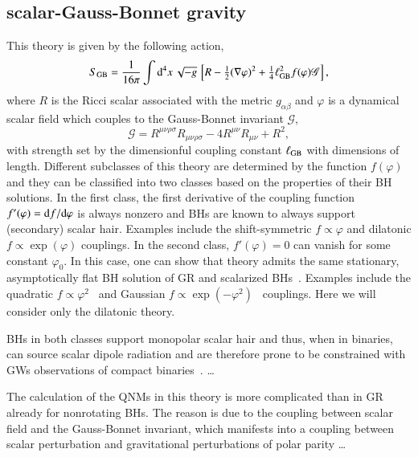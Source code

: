 \documentclass[twocolumn,
               prd,
               aps,
               superscriptaddress,
               tightenlines,
               nofootinbib,
               eqsecnum,
               amsfonts,
               amsmath,
               longbibliography]{revtex4-1}
\newcommand{\dd}{{\rm d}}
\newcommand{\dV}{{\rm d}^{4}x \, \sqrt{-g} \,}
\begin{document}
\subsection{scalar-Gauss-Bonnet gravity}
%
This theory is given by the following action,
%
\begin{equation} \label{eq:action_sgb}
    S_{\rm GB} = \frac{1}{16 \pi}
    \int \dV
    \left[
    R - \tfrac{1}{2}(\nabla \varphi)^2
    + \tfrac{1}{4} \ell^{2}_{\rm GB} f(\varphi) \mathscr{G}
    \right],
\end{equation}
%
where $R$ is the Ricci scalar associated with the metric $g_{\alpha\beta}$ and
$\varphi$ is a dynamical scalar field which couples to the Gauss-Bonnet
invariant $\mathscr{G}$,
%
\begin{equation} \label{eq:def_gb}
    \mathscr{G} =
    R^{\mu\nu\rho\sigma}R_{\mu\nu\rho\sigma}
    - 4 R^{\mu\nu}R_{\mu\nu}
    + R^2,
\end{equation}
%
with strength set by the dimensionful coupling constant $\ell_{\rm GB}$ with dimensions
of length. Different subclasses of this theory are determined by the function $f(\varphi)$
and they can be classified into two classes based on the properties of their BH solutions.
%
In the first class, the first derivative of the coupling
function $f'(\varphi) = \dd f  / \dd \varphi$ is always nonzero and BHs
are known to always support (secondary) scalar hair.
%
Examples include the shift-symmetric $f \propto \varphi$ and dilatonic
$f \propto \exp(\varphi)$ couplings.
%
In the second class, $f'(\varphi) = 0$ can vanish for some constant $\varphi_0$.
%
In this case, one can show that theory admits the same stationary,
asymptotically flat BH solution of GR and scalarized BHs~\cite{Doneva:2017bvd,Silva:2017uqg,Dima:2020yac,Herdeiro:2020wei,Berti:2020kgk}.
%
Examples include the quadratic $f \propto \varphi^2$~\cite{Silva:2017uqg}
and Gaussian $f \propto \exp(-\varphi^2)$~\cite{Doneva:2017bvd} couplings.
%
Here we will consider only the dilatonic theory.

BHs in both classes support monopolar scalar hair and thus, when in binaries,
can source scalar dipole radiation and are therefore prone to be constrained with
GWs observations of compact binaries~\cite{Nair:2019iur,Perkins:2021mhb}.
%
\dots

The calculation of the QNMs in this theory is more complicated than in GR already for
nonrotating BHs. The reason is due to the coupling between scalar field and
the Gauss-Bonnet invariant, which manifests into a coupling between scalar perturbation
and gravitational perturbations of polar parity \dots
\end{document}
